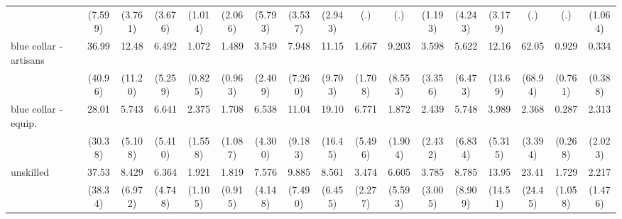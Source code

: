 {\begin{tabular}{l*{16}{c}}
                    &     (7.599)         &     (3.761)         &     (3.676)         &     (1.014)         &     (2.066)         &     (5.793)         &     (3.537)         &     (2.943)         &         (.)         &         (.)         &     (1.193)         &     (4.243)         &     (3.179)         &         (.)         &         (.)         &     (1.064)         \\
[1em]
blue collar - artisans&       36.99\sym{**} &       12.48\sym{**} &       6.492\sym{*}  &       1.072         &       1.489         &       3.549         &       7.948\sym{*}  &       11.15\sym{**} &       1.667         &       9.203\sym{*}  &       3.598         &       5.622         &       12.16\sym{*}  &       62.05\sym{***}&       0.929         &       0.334         \\
                    &     (40.96)         &     (11.20)         &     (5.259)         &     (0.825)         &     (0.963)         &     (2.409)         &     (7.260)         &     (9.703)         &     (1.708)         &     (8.553)         &     (3.356)         &     (6.473)         &     (13.69)         &     (68.94)         &     (0.761)         &     (0.388)         \\
[1em]
blue collar - equip.&       28.01\sym{**} &       5.743\sym{*}  &       6.641\sym{*}  &       2.375         &       1.708         &       6.538\sym{**} &       11.04\sym{**} &       19.10\sym{***}&       6.771\sym{*}  &       1.872         &       2.439         &       5.748         &       3.989         &       2.368         &       0.287         &       2.313         \\
                    &     (30.38)         &     (5.108)         &     (5.410)         &     (1.558)         &     (1.087)         &     (4.300)         &     (9.183)         &     (16.45)         &     (5.496)         &     (1.904)         &     (2.432)         &     (6.834)         &     (5.315)         &     (3.394)         &     (0.268)         &     (2.023)         \\
[1em]
unskilled           &       37.53\sym{***}&       8.429\sym{**} &       6.364\sym{*}  &       1.921         &       1.819         &       7.576\sym{***}&       9.885\sym{**} &       8.561\sym{**} &       3.474         &       6.605\sym{*}  &       3.785         &       8.785\sym{*}  &       13.95\sym{*}  &       23.41\sym{**} &       1.729         &       2.217         \\
                    &     (38.34)         &     (6.972)         &     (4.748)         &     (1.105)         &     (0.915)         &     (4.148)         &     (7.490)         &     (6.455)         &     (2.277)         &     (5.593)         &     (3.005)         &     (8.909)         &     (14.51)         &     (24.45)         &     (1.058)         &     (1.476)         \\

\end{tabular}}
